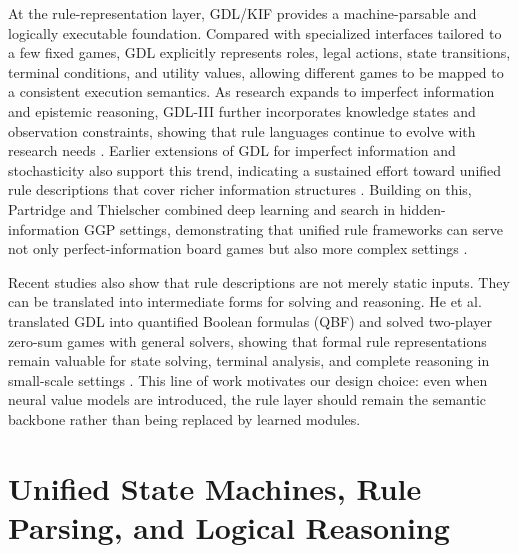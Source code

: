 At the rule-representation layer, GDL/KIF provides a machine-parsable and logically executable foundation. Compared with specialized interfaces tailored to a few fixed games, GDL explicitly represents roles, legal actions, state transitions, terminal conditions, and utility values, allowing different games to be mapped to a consistent execution semantics. As research expands to imperfect information and epistemic reasoning, GDL-III further incorporates knowledge states and observation constraints, showing that rule languages continue to evolve with research needs \cite{thielscher2017gdl3}. Earlier extensions of GDL for imperfect information and stochasticity also support this trend, indicating a sustained effort toward unified rule descriptions that cover richer information structures \cite{thielscher2010incomplete}. Building on this, Partridge and Thielscher combined deep learning and search in hidden-information GGP settings, demonstrating that unified rule frameworks can serve not only perfect-information board games but also more complex settings \cite{partridge2022hidden}.


Recent studies also show that rule descriptions are not merely static inputs. They can be translated into intermediate forms for solving and reasoning. He et al. translated GDL into quantified Boolean formulas (QBF) and solved two-player zero-sum games with general solvers, showing that formal rule representations remain valuable for state solving, terminal analysis, and complete reasoning in small-scale settings \cite{he2024qbf}. This line of work motivates our design choice: even when neural value models are introduced, the rule layer should remain the semantic backbone rather than being replaced by learned modules.


\section{Unified State Machines, Rule Parsing, and Logical Reasoning}

